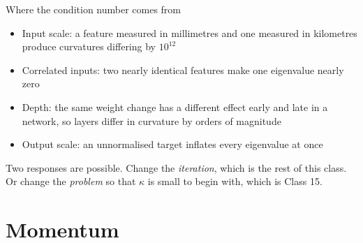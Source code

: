 \documentclass[aspectratio=169, 11pt]{beamer}
\begin{document}
\begin{frame}{Where the condition number comes from}
  \vspace{0.1em}
  \begin{itemize}\itemsep0.3em
    \item \alert{Input scale}: a feature measured in millimetres and one
          measured in kilometres produce curvatures differing by $10^{12}$
    \item \alert{Correlated inputs}: two nearly identical features make
          one eigenvalue nearly zero
    \item \alert{Depth}: the same weight change has a different effect
          early and late in a network, so layers differ in curvature by
          orders of magnitude
    \item \alert{Output scale}: an unnormalised target inflates every
          eigenvalue at once
  \end{itemize}
  \vspace{0.25em}
  \begin{redhighlight}
    Two responses are possible. Change the \emph{iteration}, which is the rest of
    this class. Or change the \emph{problem} so that $\kappa$ is small to
    begin with, which is Class 15.
  \end{redhighlight}
\end{frame}

\section{Momentum}
\end{document}
